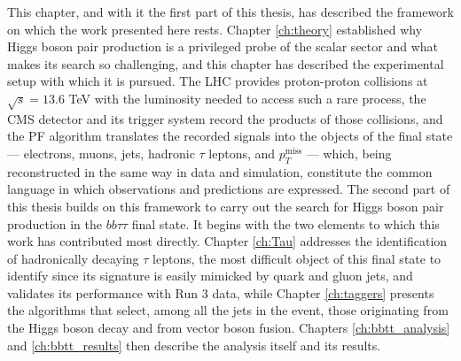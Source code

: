 This chapter, and with it the first part of this thesis, has described the framework on which the work presented here rests. Chapter \ref{ch:theory} established why Higgs boson pair production is a privileged probe of the scalar sector and what makes its search so challenging, and this chapter has described the experimental setup with which it is pursued. 
The LHC provides proton-proton collisions at $\sqrt{s}=13.6$ TeV with the luminosity needed to access such a rare process, the CMS detector and its trigger system record the products of those collisions, and the PF algorithm translates the recorded signals into the objects of the final state — electrons, muons, jets, hadronic $\tau$ leptons, and $p_T^\text{miss}$ — which, being reconstructed in the same way in data and simulation, constitute the common language in which observations and predictions are expressed. The second part of this thesis builds on this framework to carry out the search for Higgs boson pair production in the $bb\tau\tau$ final state. It begins with the two elements to which this work has contributed most directly. Chapter \ref{ch:Tau} addresses the identification of hadronically decaying $\tau$ leptons, the most difficult object of this final state to identify since its signature is easily mimicked by quark and gluon jets, and validates its performance with Run 3 data, while Chapter \ref{ch:taggers} presents the algorithms that select, among all the jets in the event, those originating from the Higgs boson decay and from vector boson fusion. Chapters \ref{ch:bbtt_analysis} and \ref{ch:bbtt_results} then describe the analysis itself and its results.



